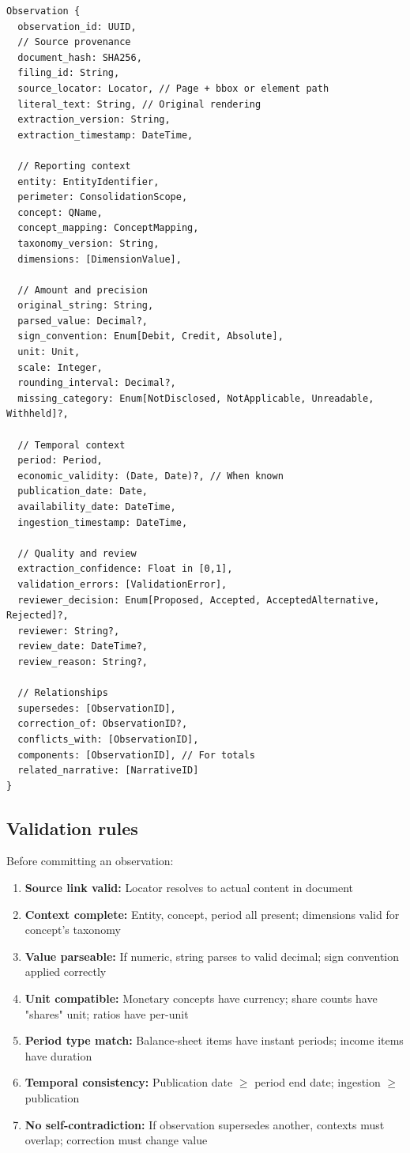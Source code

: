 \begin{lstlisting}
Observation {
  observation_id: UUID,
  // Source provenance
  document_hash: SHA256,
  filing_id: String,
  source_locator: Locator, // Page + bbox or element path
  literal_text: String, // Original rendering
  extraction_version: String,
  extraction_timestamp: DateTime,

  // Reporting context
  entity: EntityIdentifier,
  perimeter: ConsolidationScope,
  concept: QName,
  concept_mapping: ConceptMapping,
  taxonomy_version: String,
  dimensions: [DimensionValue],

  // Amount and precision
  original_string: String,
  parsed_value: Decimal?,
  sign_convention: Enum[Debit, Credit, Absolute],
  unit: Unit,
  scale: Integer,
  rounding_interval: Decimal?,
  missing_category: Enum[NotDisclosed, NotApplicable, Unreadable, Withheld]?,

  // Temporal context
  period: Period,
  economic_validity: (Date, Date)?, // When known
  publication_date: Date,
  availability_date: DateTime,
  ingestion_timestamp: DateTime,

  // Quality and review
  extraction_confidence: Float in [0,1],
  validation_errors: [ValidationError],
  reviewer_decision: Enum[Proposed, Accepted, AcceptedAlternative, Rejected]?,
  reviewer: String?,
  review_date: DateTime?,
  review_reason: String?,

  // Relationships
  supersedes: [ObservationID],
  correction_of: ObservationID?,
  conflicts_with: [ObservationID],
  components: [ObservationID], // For totals
  related_narrative: [NarrativeID]
}
\end{lstlisting}

\subsection{Validation rules}

Before committing an observation:

\begin{enumerate}
\item \textbf{Source link valid:} Locator resolves to actual content in document
\item \textbf{Context complete:} Entity, concept, period all present; dimensions
  valid for concept's taxonomy
\item \textbf{Value parseable:} If numeric, string parses to valid decimal; sign
  convention applied correctly
\item \textbf{Unit compatible:} Monetary concepts have currency; share counts have
  "shares" unit; ratios have per-unit
\item \textbf{Period type match:} Balance-sheet items have instant periods; income
  items have duration
\item \textbf{Temporal consistency:} Publication date $\geq$ period end date;
  ingestion $\geq$ publication
\item \textbf{No self-contradiction:} If observation supersedes another, contexts
  must overlap; correction must change value
\end{enumerate}


